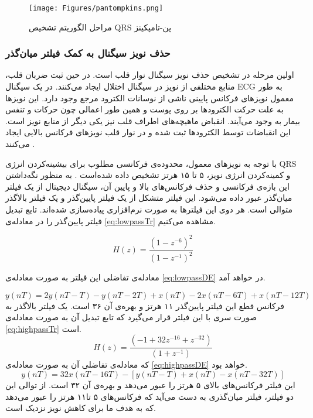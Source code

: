 \begin{figure}[!htb]
\centering
\texttt{[image: Figures/pantompkins.png]}
\caption{مراحل الگوریتم تشخیص QRS پن-تامپکینز}
\label{fig:qrsPan}
\end{figure}


		\subsubsection{حذف نویز سیگنال به کمک فیلتر میان‌گذر}
		اولین مرحله در تشخیص  حذف نویز سیگنال نوار قلب است. در حین ثبت ضربان قلب، منابع مختلفی از نویز در سیگنال اختلال ایجاد می‌کنند. در یک سیگنال ECG به طور معمول نویزهای فرکانس پایینی ناشی از نوسانات الکترود مرجع وجود دارد. این نویزها به علت حرکت الکترودها بر روی پوست و همین طور اعمالی چون حرکات و تنفس بیمار به وجود می‌آیند. انقباض ماهیچه‌های اطراف قلب نیز یکی دیگر از منابع نویز است. این انقباضات توسط الکترودها ثبت شده و در نوار قلب نویزهای فرکانس بالایی ایجاد می‌کنند \cite{Joshi2013}.
		
		با توجه به نویزهای معمول، محدوده‌ی فرکانسی مطلوب برای بیشینه‌کردن انرژی QRS و کمینه‌کردن انرژی نویز، ۵ تا ۱۵ هرتز تشخیص داده شده‌است \cite{Pan1985}. به منظور نگه‌داشتن این بازه‌ی فرکانسی و حذف فرکانس‌های بالا و پایین آن، سیگنال دیجیتال از یک فیلتر میان‌گذر عبور داده می‌شود. این فیلتر متشکل از یک فیلتر پایین‌گذر و یک فیلتر بالاگذر متوالی است. هر دوی این فیلترها به صورت نرم‌افزاری پیاده‌سازی شده‌اند.
تابع تبدیل فیلتر پایین‌گذر را در معادله‌ی \ref{eq:lowpassTr} مشاهده می‌کنیم.

\begin{equation}
	H(z) = \frac{{(1-z^{-6})}^2}{{(1-z^{-1})}^2}
\label{eq:lowpassTr}
\end{equation}
	
	معادله‌ی تفاضلی این فیلتر به صورت معادله‌ی \ref{eq:lowpassDE} در خواهد آمد.
	
\begin{equation}
	y(nT) = 2y(nT-T) - y(nT-2T) + x(nT) - 2x(nT-6T) + x(nT-12T) 
\label{eq:lowpassDE}
\end{equation}
فرکانس قطع این فیلتر پایین‌گذر ۱۱ هرتز و بهره‌ی آن ۳۶ است. یک فیلتر بالاگذر به صورت سری با این فیلتر قرار می‌گیرد که تابع تبدیل آن به صورت معادله‌ی \ref{eq:highpassTr} است.
\begin{equation}
	H(z) = \frac{{(-1+32z^{-16}+z^{-32})}}{{(1+z^{-1})}}
\label{eq:highpassTr}
\end{equation}
که معادله‌ی تفاضلی آن به صورت معادله‌ی \ref{eq:highpassDE} خواهد بود.
 \begin{equation}
	y(nT) = 32x(nT-16T) - [y(nT-T) + x(nT) - x(nT-32T)]
\label{eq:highpassDE}
\end{equation}
این فیلتر فرکانس‌های بالای ۵ هرتز را عبور می‌دهد و بهره‌ی آن ۳۲ است. از توالی این دو فیلتر، فیلتر میان‌گذری به دست می‌آید که فرکانس‌های ۵ تا۱۱ هرتز را عبور می‌دهد که به هدف ما برای کاهش نویز نزدیک است. 

